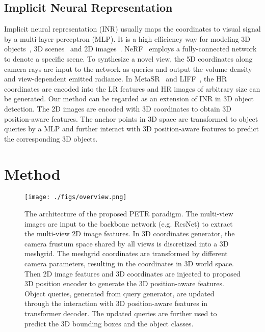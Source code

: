 \documentclass[runningheads]{llncs}
\begin{document}
\subsection{Implicit Neural Representation}
Implicit neural representation (INR) usually maps the coordinates to visual signal by a multi-layer perceptron (MLP). It is a high efficiency way for modeling 3D objects~\cite{park2019deepsdf,chen2019learning,mescheder2019occupancy}, 3D scenes~\cite{mildenhall2020nerf,sitzmann2019scene,chabra2020deep,peng2020convolutional} and 2D images~\cite{hu2019metasr,chen2021liff,tancik2020fourier,sitzmann2020implicit}. NeRF~\cite{mildenhall2020nerf} employs a fully-connected network to denote a specific scene. To synthesize a novel view, the 5D coordinates along camera rays are input to the network as queries and output the volume density and view-dependent emitted radiance. In MetaSR~\cite{hu2019metasr} and LIFF~\cite{chen2021liff}, the HR coordinates are encoded into the LR features and HR images of arbitrary size can be generated. Our method can be regarded as an extension of INR in 3D object detection. The 2D images are encoded with 3D coordinates to obtain 3D position-aware features. The anchor points in 3D space are transformed to object queries by a MLP and further interact with 3D position-aware features to predict the corresponding 3D objects.



\section{Method}

\begin{figure*}[t]
	\centering  
	\texttt{[image: ./figs/overview.png]}  
	\caption{The architecture of the proposed PETR paradigm. 
The multi-view images are input to the backbone network (e.g. ResNet) to extract the multi-view 2D image features. In 3D coordinates generator, the camera frustum space shared by all views is discretized into a 3D meshgrid. The meshgrid coordinates are transformed by different camera parameters, resulting in the coordinates in 3D world space. Then 2D image features and 3D coordinates are injected to proposed 3D position encoder to generate the 3D position-aware features. Object queries, generated from query generator, are updated through the interaction with 3D position-aware features in transformer decoder. The updated queries are further used to predict the 3D bounding boxes and the object classes.
}  
	\label{architecture}
\end{figure*}
\end{document}
